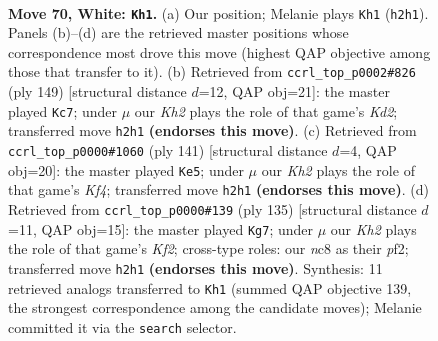 \documentclass[11pt]{article}
\begin{document}
\clearpage

\begin{figure}[p]\centering
\begin{subfigure}{0.46\textwidth}\centering
\resizebox{\linewidth}{!}{%
\newchessgame
\chessboard[
  setfen={2n1k3/8/R7/8/p5rp/P7/7K/8 w - - 2 70},
  showmover=false,
  pgfstyle=straightmove, color=movearrow, markmove={h2-h1}
]}
\caption{}
\end{subfigure}\hfill
\begin{subfigure}{0.46\textwidth}\centering
\resizebox{\linewidth}{!}{%
\newchessgame
\chessboard[
  setfen={7R/3k4/8/1K4p1/1P6/5r1P/8/8 b - - 0 75},
  showmover=false,
  pgfstyle=straightmove, color=movearrow, markmove={d7-c7}
]}
\caption{}
\end{subfigure}
\\[4pt]
\begin{subfigure}{0.46\textwidth}\centering
\resizebox{\linewidth}{!}{%
\newchessgame
\chessboard[
  setfen={8/8/8/5k1p/PR5P/4K3/r7/8 b - - 1 71},
  showmover=false,
  pgfstyle=straightmove, color=movearrow, markmove={f5-e5}
]}
\caption{}
\end{subfigure}\hfill
\begin{subfigure}{0.46\textwidth}\centering
\resizebox{\linewidth}{!}{%
\newchessgame
\chessboard[
  setfen={8/5k2/P6R/8/6p1/r7/5PK1/8 b - - 23 68},
  showmover=false,
  pgfstyle=straightmove, color=movearrow, markmove={f7-g7}
]}
\caption{}
\end{subfigure}
\caption{\textbf{Move 70, White: \texttt{Kh1}.} (a) Our position; Melanie plays \texttt{Kh1} (\texttt{h2h1}). Panels (b)--(d) are the retrieved master positions whose correspondence most drove this move (highest QAP objective among those that transfer to it). (b) Retrieved from \texttt{ccrl\_top\_p0002\#826} (ply 149) [structural distance $d$=12, QAP obj=21]: the master played \texttt{Kc7}; under $\mu$ our \emph{Kh2} plays the role of that game's \emph{Kd2}; transferred move \texttt{h2h1} \textbf{(endorses this move)}. (c) Retrieved from \texttt{ccrl\_top\_p0000\#1060} (ply 141) [structural distance $d$=4, QAP obj=20]: the master played \texttt{Ke5}; under $\mu$ our \emph{Kh2} plays the role of that game's \emph{Kf4}; transferred move \texttt{h2h1} \textbf{(endorses this move)}. (d) Retrieved from \texttt{ccrl\_top\_p0000\#139} (ply 135) [structural distance $d$=11, QAP obj=15]: the master played \texttt{Kg7}; under $\mu$ our \emph{Kh2} plays the role of that game's \emph{Kf2}; cross-type roles: our \emph{n}c8 as their \emph{p}f2; transferred move \texttt{h2h1} \textbf{(endorses this move)}. Synthesis: 11 retrieved analogs transferred to \texttt{Kh1} (summed QAP objective 139, the strongest correspondence among the candidate moves); Melanie committed it via the \texttt{search} selector.}
\label{fig:thought-m138}
\end{figure}
\end{document}

